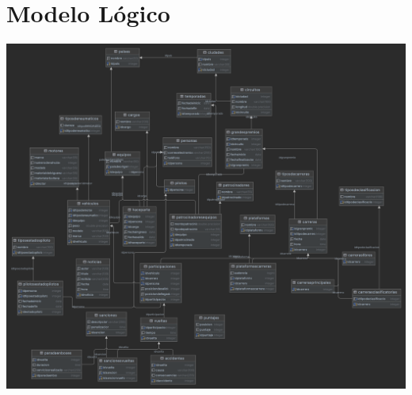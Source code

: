 \documentclass{article}
\begin{document}
	\section{Modelo Lógico}
	
	\includegraphics[width=\textwidth]{f1_Logico}
	
\end{document}
